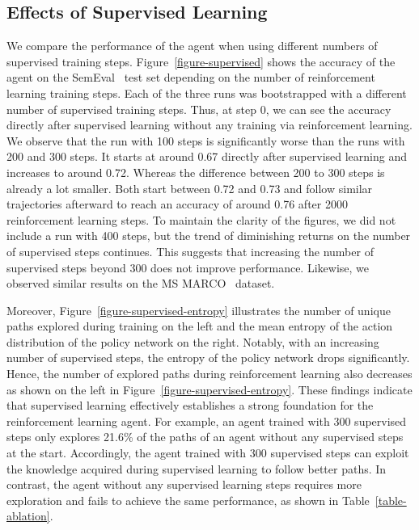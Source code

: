 


\subsection{Effects of Supervised Learning}
\label{subsec:effects-supervised}

We compare the performance of the agent when using different numbers of supervised training steps. Figure~\ref{figure-supervised} shows the accuracy of the agent on the SemEval~\cite{SharpCausalQAEmbeddings2016} test set depending on the number of reinforcement learning training steps. Each of the three runs was bootstrapped with a different number of supervised training steps. Thus, at step 0, we can see the accuracy directly after supervised learning without any training via reinforcement learning. We observe that the run with 100 steps is significantly worse than the runs with 200 and 300 steps. It starts at around 0.67 directly after supervised learning and increases to around 0.72. Whereas the difference between 200 to 300 steps is already a lot smaller. Both start between 0.72 and 0.73 and follow similar trajectories afterward to reach an accuracy of around 0.76 after 2000 reinforcement learning steps. To maintain the clarity of the figures, we did not include a run with 400 steps, but the trend of diminishing returns on the number of supervised steps continues. This suggests that increasing the number of supervised steps beyond 300 does not improve performance. Likewise, we observed similar results on the MS MARCO~\cite{Nguyen2016MSMARCO} dataset.




Moreover, Figure~\ref{figure-supervised-entropy} illustrates the number of unique paths explored during training on the left and the mean entropy of the action distribution of the policy network on the right. Notably, with an increasing number of supervised steps, the entropy of the policy network drops significantly. Hence, the number of explored paths during reinforcement learning also decreases as shown on the left in Figure~\ref{figure-supervised-entropy}. These findings indicate that supervised learning effectively establishes a strong foundation for the reinforcement learning agent. For example, an agent trained with 300 supervised steps only explores 21.6\% of the paths of an agent without any supervised steps at the start. Accordingly, the agent trained with 300 supervised steps can exploit the knowledge acquired during supervised learning to follow better paths. In contrast, the agent without any supervised learning steps requires more exploration and fails to achieve the same performance, as shown in Table~\ref{table-ablation}.

\label{subsec:examples}
